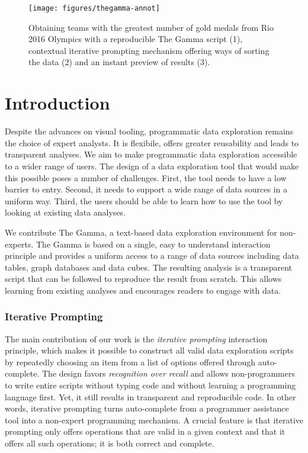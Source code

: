 \documentclass[manuscript,review,anonymous]{acmart}
\begin{document}
\maketitle

\begin{figure}
\texttt{[image: figures/thegamma-annot]}
\vspace{-0.5em}
\caption{Obtaining teams with the greatest number of gold medals from Rio 2016
Olympics with a reproducible The Gamma script (1), contextual iterative prompting mechanism
offering ways of sorting the data (2) and an instant preview of results (3).}
\label{fig:thegamma}
\vspace{-0.5em}
\end{figure}


\section{Introduction}
Despite the advances on visual tooling, programmatic data exploration remains the choice of
expert analysts. It is flexibile, offers greater reusability and leads to transparent
analyses. We aim to make programmatic data exploration accessible to a wider range of users.
The design of a data exploration tool that would make this possible poses a number of challenges.
First, the tool needs to have a low barrier to entry. Second, it needs to support a wide
range of data sources in a uniform way. Third, the users should be able to learn how to use the
tool by looking at existing data analyses.

We contribute The Gamma, a text-based data exploration environment for non-experts. The Gamma
is based on a single, easy to understand interaction principle and provides a uniform
access to a range of data sources including data tables, graph databases and data cubes.
The resulting analysis is a transparent script that can be followed to reproduce the
result from scratch. This allows learning from existing analyses and encourages readers
to engage with data.

\subsubsection*{Iterative Prompting}
The main contribution of our work is the \emph{iterative prompting} interaction principle,
which makes it possible to construct all valid data exploration scripts by repeatedly choosing
an item from a list of options offered through auto-complete. The design favors \emph{recognition
over recall} and allows non-programmers to write entire scripts without typing code and without
learning a programming language first. Yet, it still results in transparent and reproducible code.
In other words, iterative prompting turns auto-complete from a programmer
assistance tool into a non-expert programming mechanism. A crucial feature is that iterative
prompting only offers operations that are valid in a given context and that it offers all such
operations; it is both correct and complete.
\end{document}
